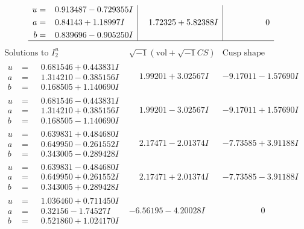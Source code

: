\documentclass[1p]{elsarticle_modified}
\theoremstyle{definition}
\newcommand{\I}{\sqrt{-1}}
\begin{document}
$$\begin{array}{c|c|c}
\begin{aligned}
u &= \phantom{-}0.913487 - 0.729355 I \\
a &= \phantom{-}0.84143 + 1.18997 I \\
b &= \phantom{-}0.839696 - 0.905250 I\end{aligned}
 & \phantom{-}1.72325 + 5.82388 I & \phantom{-0.000000 } 0\\
 \hline 
 \end{array}$$\newpage$$\begin{array}{c|c|c}  
\text{Solutions to }I^u_{2}& \I (\text{vol} + \sqrt{-1}CS) & \text{Cusp shape}\\
 \hline 
\begin{aligned}
u &= \phantom{-}0.681546 + 0.443831 I \\
a &= \phantom{-}1.314210 - 0.385156 I \\
b &= \phantom{-}0.168505 + 1.140690 I\end{aligned}
 & \phantom{-}1.99201 + 3.02567 I & -9.17011 - 1.57690 I \\ \hline\begin{aligned}
u &= \phantom{-}0.681546 - 0.443831 I \\
a &= \phantom{-}1.314210 + 0.385156 I \\
b &= \phantom{-}0.168505 - 1.140690 I\end{aligned}
 & \phantom{-}1.99201 - 3.02567 I & -9.17011 + 1.57690 I \\ \hline\begin{aligned}
u &= \phantom{-}0.639831 + 0.484680 I \\
a &= \phantom{-}0.649950 - 0.261552 I \\
b &= \phantom{-}0.343005 - 0.289428 I\end{aligned}
 & \phantom{-}2.17471 - 2.01374 I & -7.73585 + 3.91188 I \\ \hline\begin{aligned}
u &= \phantom{-}0.639831 - 0.484680 I \\
a &= \phantom{-}0.649950 + 0.261552 I \\
b &= \phantom{-}0.343005 + 0.289428 I\end{aligned}
 & \phantom{-}2.17471 + 2.01374 I & -7.73585 - 3.91188 I \\ \hline\begin{aligned}
u &= \phantom{-}1.036460 + 0.711450 I \\
a &= \phantom{-}0.32156 - 1.74527 I \\
b &= \phantom{-}0.521860 + 1.024170 I\end{aligned}
 & -6.56195 - 4.20028 I & \phantom{-0.000000 } 0 \\ \hline\begin{aligned}

\end{aligned}
\end{array}$$
\end{document}
